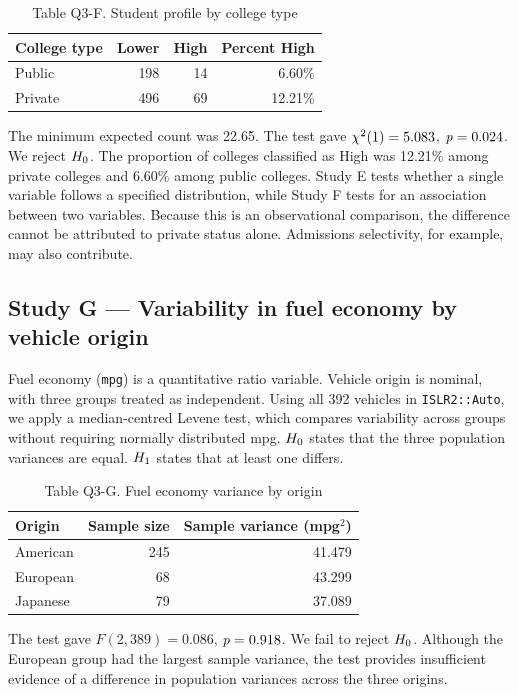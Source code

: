\begin{table}[htbp]
  \centering
  \caption*{Table Q3-F. Student profile by college type}
  \begin{tabular}{lrrr}
    \toprule
    College type & Lower & High & Percent High \\
    \midrule
    Public & 198 & 14 & 6.60\% \\
    Private & 496 & 69 & 12.21\% \\
    \bottomrule
  \end{tabular}
\end{table}

The minimum expected count was 22.65. The test gave $\chi^2(1) = 5.083$, $\mathit{p} = 0.024$. We reject $H_0$. The proportion of colleges classified as High was 12.21\% among private colleges and 6.60\% among public colleges. Study E tests whether a single variable follows a specified distribution, while Study F tests for an association between two variables. Because this is an observational comparison, the difference cannot be attributed to private status alone. Admissions selectivity, for example, may also contribute.

\FloatBarrier
\subsection*{Study G --- Variability in fuel economy by vehicle origin}

Fuel economy (\texttt{mpg}) is a quantitative ratio variable. Vehicle origin is nominal, with three groups treated as independent. Using all 392 vehicles in \texttt{ISLR2::Auto}, we apply a median-centred Levene test, which compares variability across groups without requiring normally distributed mpg. $H_0$ states that the three population variances are equal. $H_1$ states that at least one differs.

\begin{table}[htbp]
  \centering
  \caption*{Table Q3-G. Fuel economy variance by origin}
  \begin{tabular}{lrr}
    \toprule
    Origin & Sample size & Sample variance (mpg$^2$) \\
    \midrule
    American & 245 & 41.479 \\
    European & 68 & 43.299 \\
    Japanese & 79 & 37.089 \\
    \bottomrule
  \end{tabular}
\end{table}

The test gave $F(2, 389) = 0.086$, $\mathit{p} = 0.918$. We fail to reject $H_0$. Although the European group had the largest sample variance, the test provides insufficient evidence of a difference in population variances across the three origins.
